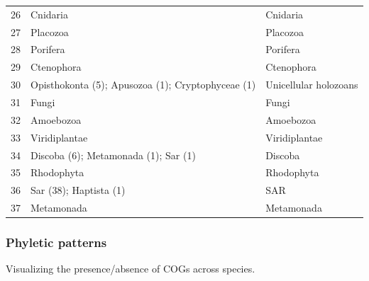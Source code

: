 \begin{table}[H]
\begin{tabular}[t]{rll}
26 & Cnidaria & Cnidaria\\
\rowcolor{gray!6}  27 & Placozoa & Placozoa\\
28 & Porifera & Porifera\\
\rowcolor{gray!6}  29 & Ctenophora & Ctenophora\\
30 & Opisthokonta (5); Apusozoa (1); Cryptophyceae (1) & Unicellular holozoans\\
\rowcolor{gray!6}  31 & Fungi & Fungi\\
32 & Amoebozoa & Amoebozoa\\
\rowcolor{gray!6}  33 & Viridiplantae & Viridiplantae\\
34 & Discoba (6); Metamonada (1); Sar (1) & Discoba\\
\rowcolor{gray!6}  35 & Rhodophyta & Rhodophyta\\
36 & Sar (38); Haptista (1) & SAR\\
\rowcolor{gray!6}  37 & Metamonada & Metamonada\\
\bottomrule
\end{tabular}
\end{table}

\hypertarget{phyletic-patterns}{%
\subsubsection{Phyletic patterns}\label{phyletic-patterns}}

Visualizing the presence/absence of COGs across species.

